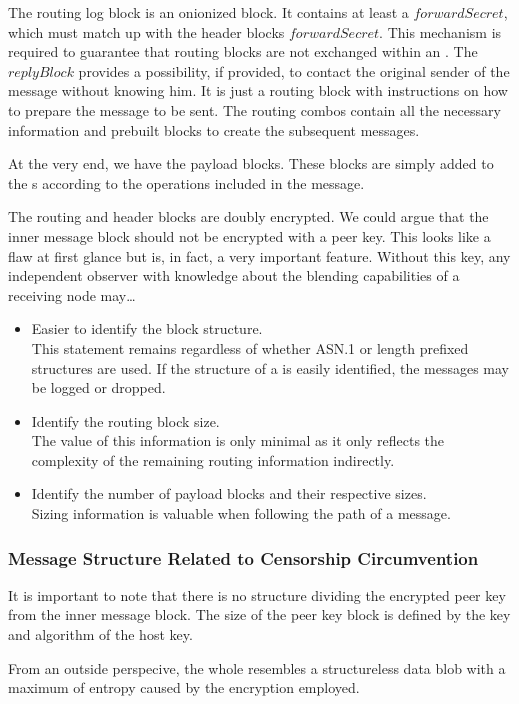 The routing log block is an onionized block. It contains at least a $forwardSecret$, which must match up with the header blocks $forwardSecret$. This mechanism is required to guarantee that routing blocks are not exchanged within an . The $replyBlock$ provides a possibility, if provided, to contact the original sender of the message without knowing him. It is just a routing block with instructions on how to prepare the message to be sent. The routing combos contain all the necessary information and prebuilt blocks to create the subsequent messages.

At the very end, we have the payload blocks. These blocks are simply added to the s  according to the operations included in the message.

The routing and header blocks are doubly encrypted. We could argue that the inner message block should not be encrypted with a peer key. This looks like a flaw at first glance but is, in fact, a very important feature. Without this key, any independent observer with knowledge about the blending capabilities of a receiving node may\ldots
\begin{itemize}
	\item Easier to identify the block structure.\\ 
	This statement remains regardless of whether ASN.1 or length prefixed structures are used. If the structure of a \VortexMessage{} is easily identified, the messages may be logged or dropped.
	\item Identify the routing block size.\\
	The value of this information is only minimal as it only reflects the complexity of the remaining routing information indirectly.
	\item Identify the number of payload blocks and their respective sizes. \\
	Sizing information is valuable when following the path of a message.
\end{itemize}

\subsubsection{Message Structure Related to Censorship Circumvention}
It is important to note that there is no structure dividing the encrypted peer key from the inner message block. The size of the peer key block is defined by the key and algorithm of the host key. 

From an outside perspecive, the whole \VortexMessage{} resembles a structureless data blob with a maximum of entropy caused by the encryption employed. 

